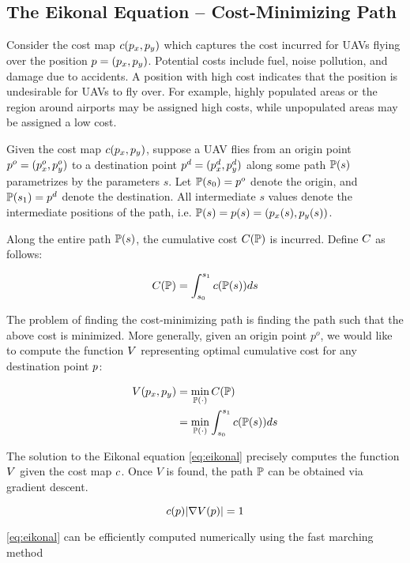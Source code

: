 \subsection{The Eikonal Equation -- Cost-Minimizing Path}
Consider the cost map $c(p_x, p_y)$ which captures the cost incurred for UAVs flying over the position $p = (p_x, p_y)$. Potential costs include fuel, noise pollution, and damage due to accidents. A position with high cost indicates that the position is undesirable for UAVs to fly over. For example, highly populated areas or the region around airports may be assigned high costs, while unpopulated areas may be assigned a low cost.

Given the cost map $c(p_x, p_y)$, suppose a UAV flies from an origin point $p^o = (p_x^o, p_y^o)$ to a destination point $p^d = (p_x^d, p_y^d)$ along some path $\mathbb{P}(s)$ parametrizes by the parameters $s$. Let $\mathbb{P}(s_0) = p^o$ denote the origin, and $\mathbb{P}(s_1) = p^d$ denote the destination. All intermediate $s$ values denote the intermediate positions of the path, i.e. $\mathbb{P}(s) = p(s) = (p_x(s), p_y(s))$.

Along the entire path $\mathbb{P}(s)$, the cumulative cost $C(\mathbb{P})$ is incurred. Define $C$ as follows:

\begin{equation}
C(\mathbb{P}) = \int_{s_0}^{s_1} c(\mathbb{P}(s)) ds
\end{equation}

The problem of finding the cost-minimizing path is finding the path such that the above cost is minimized. More generally, given an origin point $p^o$, we would like to compute the function $V$ representing optimal cumulative cost for any destination point $p$:

\begin{equation}
\begin{aligned}
V(p_x, p_y) &= \min_{\mathbb{P}(\cdot)} C(\mathbb{P}) \\
&= \min_{\mathbb{P}(\cdot)} \int_{s_0}^{s_1} c(\mathbb{P}(s)) ds
\end{aligned}
\end{equation}

The solution to the Eikonal equation \eqref{eq:eikonal} precisely computes the function $V$ given the cost map $c$. Once $V$ is found, the path $\mathbb{P}$ can be obtained via gradient descent.

\begin{equation}
\label{eq:eikonal}
c(p)|\nabla V(p)| = 1
\end{equation}

\eqref{eq:eikonal} can be efficiently computed numerically using the fast marching method \cite{}